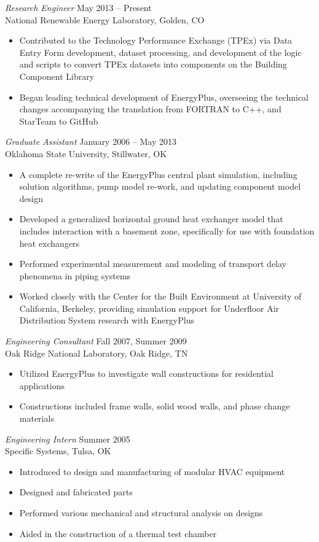 \documentclass{res} %
\begin{document}
\begin{resume}
{\sl Research Engineer} \dotfill May 2013 -- Present \\
National Renewable Energy Laboratory, Golden, CO
\begin{itemize} \itemsep -2pt
	\item Contributed to the Technology Performance Exchange (TPEx) via Data Entry Form development, dataset processing, and development of the logic and scripts to convert TPEx datasets into components on the Building Component Library
	\item Began leading technical development of EnergyPlus, overseeing the technical changes accompanying the translation from FORTRAN to C++, and StarTeam to GitHub
\end{itemize}

{\sl Graduate Assistant} \dotfill January 2006 -- May 2013 \\
Oklahoma State University, Stillwater, OK
\begin{itemize} \itemsep -2pt
	\item A complete re-write of the EnergyPlus central plant simulation, including solution algorithms, pump model re-work, and updating component model design  
	\item Developed a generalized horizontal ground heat exchanger model that includes interaction with a basement zone, specifically for use with foundation heat exchangers
	\item Performed experimental measurement and modeling of transport delay phenomena in piping systems
	\item Worked closely with the Center for the Built Environment at University of California, Berkeley, providing simulation support for Underfloor Air Distribution System research with EnergyPlus
\end{itemize}

{\sl Engineering Consultant} \dotfill Fall 2007, Summer 2009 \\
Oak Ridge National Laboratory, Oak Ridge, TN
\begin{itemize} \itemsep -2pt
	\item Utilized EnergyPlus to investigate wall constructions for residential applications
	\item Constructions included frame walls, solid wood walls, and phase change materials
\end{itemize}

{\sl Engineering Intern} \dotfill Summer 2005 \\
Specific Systems, Tulsa, OK
\begin{itemize} \itemsep -2pt
	\item Introduced to design and manufacturing of modular HVAC equipment
	\item Designed and fabricated parts
	\item Performed various mechanical and structural analysis on designs
	\item Aided in the construction of a thermal test chamber
\end{itemize}


\end{resume}
\end{document}
